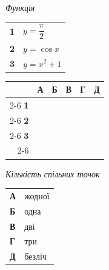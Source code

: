 \documentclass[14pt]{extarticle}
\begin{document}
\vspace{0.3cm}

\noindent
\begin{minipage}[t]{0.45\textwidth}
    \textit{Функція} \par \vspace{0.2cm}
    \begin{tabular}{@{}p{0.5cm} p{5cm}@{}}
    \textbf{1} & $y=\dfrac{\pi}{2}$ \\[0.3cm]
    \textbf{2} & $y=\cos x$ \\[0.3cm]
    \textbf{3} & $y=x^2+1$ \\
    \end{tabular}
    
    \vspace{0.5cm}
    
    \begingroup
    \setlength{\tabcolsep}{4pt}
    \renewcommand{\arraystretch}{1.2}
    \small
    \begin{tabular}{r|c|c|c|c|c|}
         \multicolumn{1}{c}{} & \multicolumn{1}{c}{\textbf{А}} & \multicolumn{1}{c}{\textbf{Б}} & \multicolumn{1}{c}{\textbf{В}} & \multicolumn{1}{c}{\textbf{Г}} & \multicolumn{1}{c}{\textbf{Д}} \\ \cline{2-6}
         \textbf{1} & & & & & \\ \cline{2-6}
         \textbf{2} & & & & & \\ \cline{2-6}
         \textbf{3} & & & & & \\ \cline{2-6}
    \end{tabular}
    \endgroup
\end{minipage}%
\hfill
\begin{minipage}[t]{0.50\textwidth}
    \textit{Кількість спільних точок} \par \vspace{0.2cm}
    \begin{tabular}{@{}p{0.5cm} p{7.5cm}@{}}
    \textbf{А} & жодної \\[0.3cm]
    \textbf{Б} & одна \\[0.3cm]
    \textbf{В} & дві \\[0.3cm]
    \textbf{Г} & три \\[0.3cm]
    \textbf{Д} & безліч \\
    \end{tabular}
\end{minipage}
\vspace{0.7cm}
\end{document}
